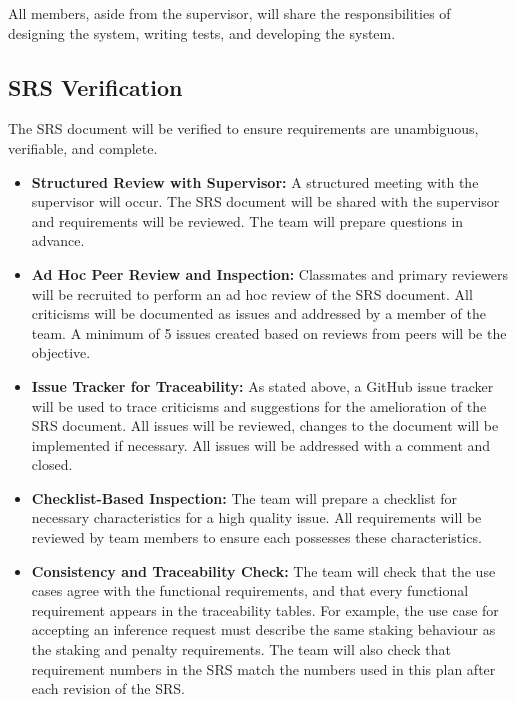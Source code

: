 \documentclass[12pt]{article}
\begin{document}
All members, aside from the supervisor, will share the responsibilities of designing the system, writing tests, and developing the system.


\subsection{SRS Verification}
The SRS document will be verified to ensure requirements are unambiguous, verifiable, and complete.




\begin{itemize}
  \item \textbf{Structured Review with Supervisor: } 
  A structured meeting with the supervisor will occur. The SRS document will be shared 
  with the supervisor and requirements will be reviewed. The team will prepare questions 
  in advance.
  \item \textbf{Ad Hoc Peer Review and Inspection: } Classmates and primary reviewers will be 
  recruited to perform an ad hoc review of the SRS document. All criticisms will be documented 
  as issues and addressed by a member of the team. A minimum of 5 issues created based on reviews 
  from peers will be the objective.
  \item \textbf{Issue Tracker for Traceability: } As stated above, a GitHub issue tracker will be 
  used to trace criticisms and suggestions for the amelioration of the SRS document. All issues 
  will be reviewed, changes to the document will be implemented if necessary. All issues will 
  be addressed with a comment and closed.
  \item \textbf{Checklist-Based Inspection: } The team will prepare a checklist for necessary 
  characteristics for a high quality issue. All requirements will be reviewed by team members 
  to ensure each possesses these characteristics.
  \item \textbf{Consistency and Traceability Check: } The team will check that the use cases agree with the
  functional requirements, and that every functional requirement appears in the traceability tables. For
  example, the use case for accepting an inference request must describe the same staking behaviour as the
  staking and penalty requirements. The team will also check that requirement numbers in the SRS match the
  numbers used in this plan after each revision of the SRS.
\end{itemize}
\end{document}
